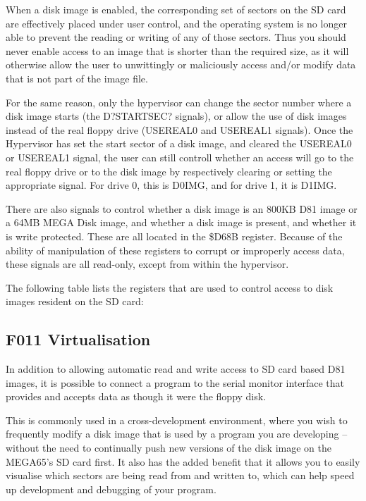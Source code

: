 When a disk image is enabled, the corresponding set of sectors on the
SD card are effectively placed under user control, and the operating
system is no longer able to prevent the reading or writing of any of
those sectors.  Thus you should never enable access to an image that
is shorter than the required size, as it will otherwise allow the user
to unwittingly or maliciously access and/or modify data that is not
part of the image file.

For the same reason, only the hypervisor can change the sector number
where a disk image starts (the D?STARTSEC? signals), or allow the use
of disk images instead of the real floppy drive (USEREAL0 and USEREAL1
signals).  Once the Hypervisor has set the start sector of a disk
image, and cleared the USEREAL0 or USEREAL1 signal, the user can still
controll whether an access will go to the real floppy drive or to the
disk image by respectively clearing or setting the appropriate
signal.  For drive 0, this is D0IMG, and for drive 1, it is D1IMG.

There are also signals to control whether a disk image is an 800KB
D81 image or a 64MB MEGA Disk image, and whether a disk image is
present, and whether it is write protected. These are all located in
the \$D68B register. Because of the ability of manipulation of these
registers to corrupt or improperly access data, these signals are all
read-only, except from within the hypervisor.

The following table lists the registers that are used to control
access to disk images resident on the SD card:



\subsection{F011 Virtualisation}

In addition to allowing automatic read and write access to SD card
based D81 images, it is possible to connect a program to the serial
monitor interface that provides and accepts data as though it were the
floppy disk.

This is commonly used in a cross-development
environment, where you wish to frequently modify a disk image that is
used by a program you are developing -- without the need to
continually push new versions of the disk image on the MEGA65's
SD card first. It also has the added benefit that it allows you to
easily visualise which sectors are being read from and written to,
which can help speed up development and debugging of your program.

